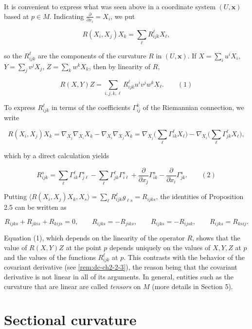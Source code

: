 \begin{remark}[Remark 2.6]
  \label{rem:dc-ch4-2-6}
  It is convenient to express what was seen above in a coordinate system $(U,\mathbf{x})$
  based at $p\in M$. Indicating $\frac{\partial}{\partial x_i}=X_i$, we put
  
  $$
  R(X_i,X_j)X_k=\sum_\ell R_{ijk}^\ell X_\ell,
  $$
  
  so the $R_{ijk}^\ell$ are the components of the curvature $R$ in $(U,\mathbf{x})$.
  If $X=\sum_i u^i X_i$, $Y=\sum_j v^j X_j$, $Z=\sum_k w^k X_k$, then by linearity of
  $R$,
  
  $$
  R(X,Y)Z=\sum_{i,j,k,\ell}R_{ijk}^\ell u^i v^j w^k X_\ell.\qquad(1)
  $$
  
  To express $R_{ijk}^\ell$ in terms of the coefficients $\Gamma_{ij}^k$ of the
  Riemannian connection, we write
  
  $$
  R(X_i,X_j)X_k=\nabla_{X_j}\nabla_{X_i}X_k-\nabla_{X_i}\nabla_{X_j}X_k=\nabla_{X_j}\Big(\sum_\ell\Gamma_{ik}^\ell X_\ell\Big)-\nabla_{X_i}\Big(\sum_\ell\Gamma_{jk}^\ell X_\ell\Big),
  $$
  
  which by a direct calculation yields
  
  $$
  R_{ijk}^s=\sum_\ell\Gamma_{ik}^\ell\Gamma_{j\ell}^s-\sum_\ell\Gamma_{jk}^\ell\Gamma_{i\ell}^s+\frac{\partial}{\partial x_j}\Gamma_{ik}^s-\frac{\partial}{\partial x_i}\Gamma_{jk}^s.\qquad(2)
  $$
  
  Putting $\langle R(X_i,X_j)X_k,X_s\rangle=\sum_\ell R_{ijk}^\ell g_{\ell s}=R_{ijks}$,
  the identities of Proposition 2.5 can be written as
  
  $$
  R_{ijks}+R_{jkis}+R_{kijs}=0,\qquad R_{ijks}=-R_{jiks},\qquad R_{ijks}=-R_{ijsk},\qquad R_{ijks}=R_{ksij}.
  $$
  
  Equation (1), which depends on the linearity of the operator $R$, shows that the
  value of $R(X,Y)Z$ at the point $p$ depends uniquely on the values of $X,Y,Z$ at
  $p$ and the values of the functions $R_{ijk}^\ell$ at $p$. This contrasts with the
  behavior of the covariant derivative (see \cref{rem:dc-ch2-2-3}), the reason
  being that the covariant derivative is not linear in all of its arguments. In
  general, entities such as the curvature that are linear are called \emph{tensors} on
  $M$ (more details in Section 5).
\end{remark}

\section{Sectional curvature}

